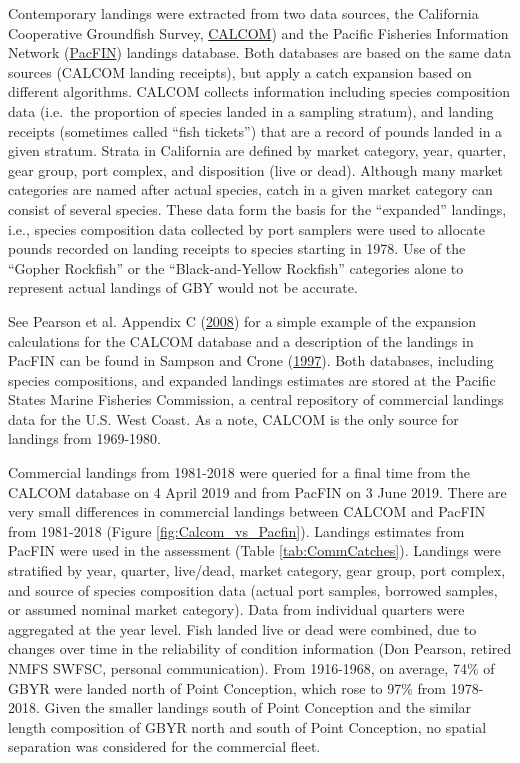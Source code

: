 \documentclass[12pt,]{article}
\begin{document}
Contemporary landings were extracted from two data sources, the
California Cooperative Groundfish Survey,
\href{https://calcom.psmfc.org/}{CALCOM}) and the Pacific Fisheries
Information Network (\href{https://pacfin.psmfc.org/}{PacFIN}) landings
database. Both databases are based on the same data sources (CALCOM
landing receipts), but apply a catch expansion based on different
algorithms. CALCOM collects information including species composition
data (i.e.~the proportion of species landed in a sampling stratum), and
landing receipts (sometimes called ``fish tickets'') that are a record
of pounds landed in a given stratum. Strata in California are defined by
market category, year, quarter, gear group, port complex, and
disposition (live or dead). Although many market categories are named
after actual species, catch in a given market category can consist of
several species. These data form the basis for the ``expanded''
landings, i.e., species composition data collected by port samplers were
used to allocate pounds recorded on landing receipts to species starting
in 1978. Use of the ``Gopher Rockfish'' or the ``Black-and-Yellow
Rockfish'' categories alone to represent actual landings of GBY would
not be accurate.

See Pearson et al. Appendix C
(\protect\hyperlink{ref-Pearson2008}{2008}) for a simple example of the
expansion calculations for the CALCOM database and a description of the
landings in PacFIN can be found in Sampson and Crone
(\protect\hyperlink{ref-Sampson1997}{1997}). Both databases, including
species compositions, and expanded landings estimates are stored at the
Pacific States Marine Fisheries Commission, a central repository of
commercial landings data for the U.S. West Coast. As a note, CALCOM is
the only source for landings from 1969-1980.

Commercial landings from 1981-2018 were queried for a final time from
the CALCOM database on 4 April 2019 and from PacFIN on 3 June 2019.
There are very small differences in commercial landings between CALCOM
and PacFIN from 1981-2018 (Figure \ref{fig:Calcom_vs_Pacfin}). Landings
estimates from PacFIN were used in the assessment (Table
\ref{tab:CommCatches}). Landings were stratified by year, quarter,
live/dead, market category, gear group, port complex, and source of
species composition data (actual port samples, borrowed samples, or
assumed nominal market category). Data from individual quarters were
aggregated at the year level. Fish landed live or dead were combined,
due to changes over time in the reliability of condition information
(Don Pearson, retired NMFS SWFSC, personal communication). From
1916-1968, on average, 74\% of GBYR were landed north of Point
Conception, which rose to 97\% from 1978-2018. Given the smaller
landings south of Point Conception and the similar length composition of
GBYR north and south of Point Conception, no spatial separation was
considered for the commercial fleet.
\end{document}
